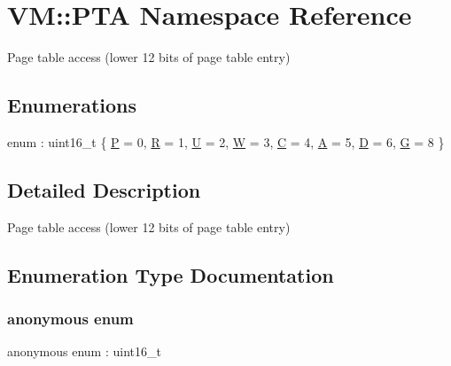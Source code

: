 \hypertarget{namespace_v_m_1_1_p_t_a}{}\section{VM\+:\+:P\+TA Namespace Reference}
\label{namespace_v_m_1_1_p_t_a}


Page table access (lower 12 bits of page table entry)  


\subsection*{Enumerations}
\begin{DoxyCompactItemize}
\item 
enum \+: uint16\+\_\+t \{ \newline
\hyperlink{namespace_v_m_1_1_p_t_a_af6c6ca8f4c319eea5695da938dfdd4c4a807772f9595a363566fba6fdf733e8f9}{P} = 0, 
\hyperlink{namespace_v_m_1_1_p_t_a_af6c6ca8f4c319eea5695da938dfdd4c4a8845432dbb156062ae5103d618c41d75}{R} = 1, 
\hyperlink{namespace_v_m_1_1_p_t_a_af6c6ca8f4c319eea5695da938dfdd4c4a1328ecb0d0d696708fff0e2492b864be}{U} = 2, 
\hyperlink{namespace_v_m_1_1_p_t_a_af6c6ca8f4c319eea5695da938dfdd4c4a09b0f0ebacacbb343e02d17dedc2ed4e}{W} = 3, 
\newline
\hyperlink{namespace_v_m_1_1_p_t_a_af6c6ca8f4c319eea5695da938dfdd4c4a789da119278c61f741fe1ed3efc8e0d3}{C} = 4, 
\hyperlink{namespace_v_m_1_1_p_t_a_af6c6ca8f4c319eea5695da938dfdd4c4a0bffb3e999362e382526209e130dec62}{A} = 5, 
\hyperlink{namespace_v_m_1_1_p_t_a_af6c6ca8f4c319eea5695da938dfdd4c4ac77057cf7fa6ca270c2b31f0c24125df}{D} = 6, 
\hyperlink{namespace_v_m_1_1_p_t_a_af6c6ca8f4c319eea5695da938dfdd4c4a07e37da4a960b9f69565a92c812da75c}{G} = 8
 \}
\end{DoxyCompactItemize}


\subsection{Detailed Description}
Page table access (lower 12 bits of page table entry) 

\subsection{Enumeration Type Documentation}
\mbox{\label{namespace_v_m_1_1_p_t_a_af6c6ca8f4c319eea5695da938dfdd4c4}} 
\subsubsection{\texorpdfstring{anonymous enum}{anonymous enum}}
{\footnotesize\ttfamily anonymous enum \+: uint16\+\_\+t}

